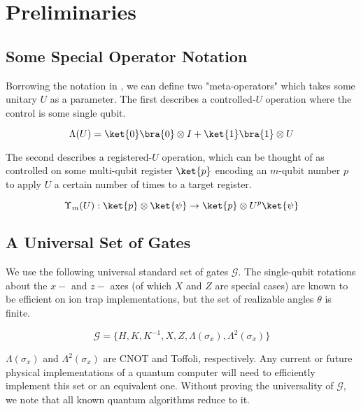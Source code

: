 \section{Preliminaries}
\label{sec:prelims}

\subsection{Some Special Operator Notation}

Borrowing the notation in \cite{ksv02},
we can define two "meta-operators" which takes some unitary $U$ as
a parameter. The first describes a controlled-$U$ operation where the control
is some single qubit.

\begin{displaymath}
\Lambda(U) = \ket{0}\bra{0} \otimes I + \ket{1}\bra{1} \otimes U
\end{displaymath}

The second describes a registered-$U$ operation, which
can be thought of as controlled on some multi-qubit register $\ket{p}$
encoding an $m$-qubit number $p$ to apply $U$ a certain number of times to a
target
register.

\begin{displaymath}
\Upsilon_m(U) : \ket{p} \otimes \ket{\psi} \rightarrow \ket{p}
\otimes U^p\ket{\psi}
\end{displaymath}

\subsection{A Universal Set of Gates}

We use the following universal standard set of gates $\mathcal{G}$.
The single-qubit rotations about the $x-$ and $z-$ axes
(of which $X$ and $Z$
are special cases) are known to be efficient on ion trap
implementations, but the set of realizable angles $\theta$ is finite.

\begin{displaymath}
\mathcal{G} = \{ H, K, K^{-1}, X, Z,
\Lambda(\sigma_x), \Lambda^2(\sigma_x) \}
\end{displaymath}

$\Lambda(\sigma_x)$ and $\Lambda^2(\sigma_x)$ are CNOT and Toffoli,
respectively.
Any current or future physical implementations of a quantum
computer will need to efficiently implement this set or an equivalent one.
Without proving the universality of $\mathcal{G}$, we note that all known
quantum algorithms reduce to it.

